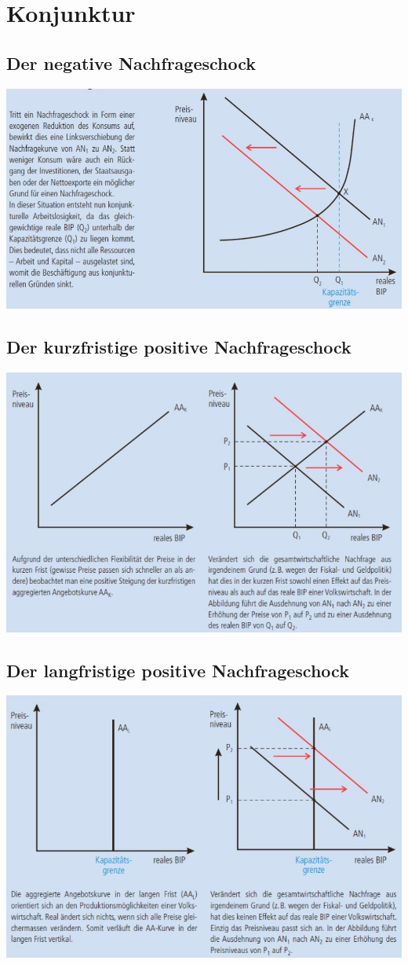 \section{Konjunktur}
\subsection{Der negative Nachfrageschock}
\includegraphics[width=0.9\linewidth]{images/negnach.jpg}
\subsection{Der kurzfristige positive Nachfrageschock}
\includegraphics[width=0.9\linewidth]{images/posnachkurz.jpg}
\subsection{Der langfristige positive Nachfrageschock}
\includegraphics[width=0.9\linewidth]{images/posnachlang.jpg}
